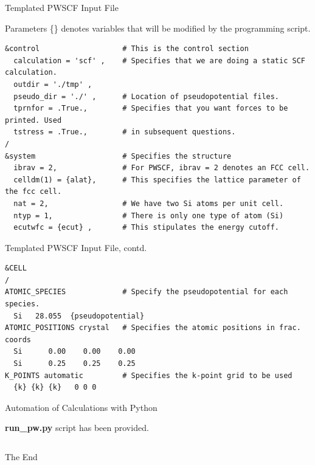 \documentclass[aspectratio=169]{beamer}
\begin{document}
    \begin{frame}[fragile]{Templated PWSCF Input File}

        \begin{alertblock}{Parameters}
            \{\} denotes variables that will be modified by the programming script.
        \end{alertblock}

        \footnotesize
        \begin{verbatim}
&control                   # This is the control section
  calculation = 'scf' ,    # Specifies that we are doing a static SCF calculation.
  outdir = './tmp' ,
  pseudo_dir = './' ,      # Location of pseudopotential files.
  tprnfor = .True.,        # Specifies that you want forces to be printed. Used
  tstress = .True.,        # in subsequent questions.
/
&system                    # Specifies the structure
  ibrav = 2,               # For PWSCF, ibrav = 2 denotes an FCC cell.
  celldm(1) = {alat},      # This specifies the lattice parameter of the fcc cell.
  nat = 2,                 # We have two Si atoms per unit cell.
  ntyp = 1,                # There is only one type of atom (Si)
  ecutwfc = {ecut} ,       # This stipulates the energy cutoff.
        \end{verbatim}


    \end{frame}


    \begin{frame}[fragile]{Templated PWSCF Input File, contd.}
        \footnotesize
        \begin{verbatim}
&CELL
/
ATOMIC_SPECIES             # Specify the pseudopotential for each species.
  Si   28.055  {pseudopotential}
ATOMIC_POSITIONS crystal   # Specifies the atomic positions in frac. coords
  Si      0.00    0.00    0.00
  Si      0.25    0.25    0.25
K_POINTS automatic         # Specifies the k-point grid to be used
  {k} {k} {k}   0 0 0
        \end{verbatim}

    \end{frame}

    \begin{frame}[fragile]{Automation of Calculations with Python}

        \textbf{run\_pw.py} script has been provided.

        \inputminted{python}{code/Lab_2_code.py}

    \end{frame}

%     
%     

    \begin{frame}
        \Huge{\centerline{The End}}
    \end{frame}
\end{document}
